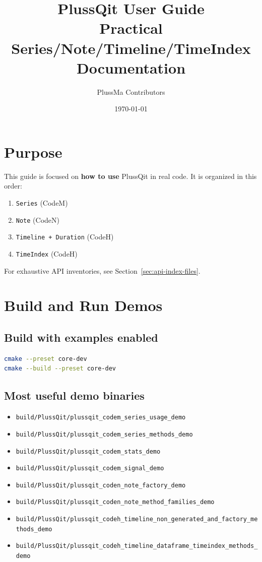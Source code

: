 \documentclass[11pt]{article}
\title{PlussQit User Guide\\\large Practical Series/Note/Timeline/TimeIndex Documentation}
\author{PlussMa Contributors}
\date{\today}
\begin{document}
\maketitle
\tableofcontents
\newpage

\section{Purpose}
This guide is focused on \textbf{how to use} PlussQit in real code.
It is organized in this order:
\begin{enumerate}[leftmargin=1.5em]
  \item \texttt{Series} (CodeM)
  \item \texttt{Note} (CodeN)
  \item \texttt{Timeline + Duration} (CodeH)
  \item \texttt{TimeIndex} (CodeH)
\end{enumerate}

For exhaustive API inventories, see Section~\ref{sec:api-index-files}.

\section{Build and Run Demos}
\subsection{Build with examples enabled}
\begin{lstlisting}[language=bash]
cmake --preset core-dev
cmake --build --preset core-dev
\end{lstlisting}

\subsection{Most useful demo binaries}
\begin{itemize}[leftmargin=1.5em]
  \item \texttt{build/PlussQit/plussqit\_codem\_series\_usage\_demo}
  \item \texttt{build/PlussQit/plussqit\_codem\_series\_methods\_demo}
  \item \texttt{build/PlussQit/plussqit\_codem\_stats\_demo}
  \item \texttt{build/PlussQit/plussqit\_codem\_signal\_demo}
  \item \texttt{build/PlussQit/plussqit\_coden\_note\_factory\_demo}
  \item \texttt{build/PlussQit/plussqit\_coden\_note\_method\_families\_demo}
  \item \texttt{build/PlussQit/plussqit\_codeh\_timeline\_non\_generated\_and\_factory\_methods\_demo}
  \item \texttt{build/PlussQit/plussqit\_codeh\_timeline\_dataframe\_timeindex\_methods\_demo}
\end{itemize}
\end{document}
